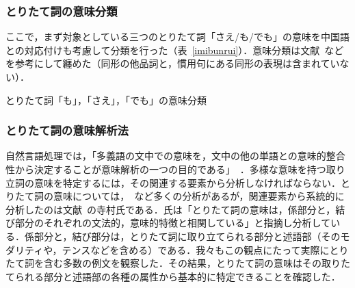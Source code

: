 \subsubsection{とりたて詞の意味分類}
ここで，まず対象としている三つのとりたて詞「さえ/も/でも」の意味を中国語との対応付けも考慮して分類を行った（表~\ref{imibunrui}）．意味分類は文献~\cite{teramura91,kinsui00,okutsu86,matsumura68,gu97}などを参考にして纏めた（同形の他品詞と，慣用句にある同形の表現は含まれていない）．

\begin{table}[hbtp]
\begin{center}
 \caption{とりたて詞「も」，「さえ」，「でも」の意味分類}
\label{imibunrui}
\end{center}
\end{table}


\subsubsection{とりたて詞の意味解析法}
自然言語処理では，「多義語の文中での意味を，文中の他の単語との意味的整合性から決定することが意味解析の一つの目的である」~\cite{nagao96}．多様な意味を持つ取り立詞の意味を特定するには，その関連する要素から分析しなければならない．とりたて詞の意味については，~\cite{teramura91,kinsui00,okutsu86,miyajima95}など多くの分析があるが，関連要素から系統的に分析したのは文献~\cite{teramura91}の寺村氏である．氏は「とりたて詞の意味は，係部分と，結び部分のそれぞれの文法的，意味的特徴と相関している」と指摘し分析している．係部分と，結び部分は，とりたて詞に取り立てられる部分と述語部（そのモダリティや，テンスなどを含める）である．我々もこの観点にたって実際にとりたて詞を含む多数の例文を観察した．その結果，とりたて詞の意味はその取りたてられる部分と述語部の各種の属性から基本的に特定できることを確認した．

